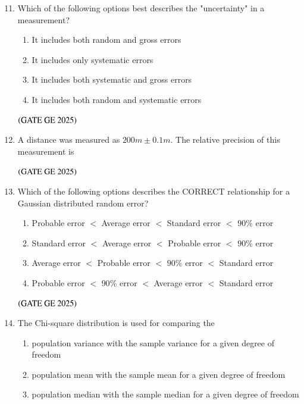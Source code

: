 \documentclass[journal,12pt,onecolumn]{IEEEtran}
\theoremstyle{remark}
\begin{document}
\begin{enumerate}
\setcounter{enumi}{10}
\item Which of the following options best describes the "uncertainty" in a measurement?
\begin{enumerate}
\item It includes both random and gross errors
\item It includes only systematic errors
\item It includes both systematic and gross errors
\item It includes both random and systematic errors
\end{enumerate}
\hfill $\left(\text{GATE GE 2025}\right)$
\bigskip

\item A distance was measured as $200 m \pm 0.1 m$.
The relative precision of this measurement is
\begin{enumerate}
\end{enumerate}
\hfill $\left(\text{GATE GE 2025}\right)$
\bigskip
\item Which of the following options describes the CORRECT relationship for a Gaussian distributed random error?
\begin{enumerate}
\item Probable error $<$ Average error $<$ Standard error $<$ $90$\% error
\item Standard error $<$ Average error $<$ Probable error $<$ $90$\% error
\item Average error $<$ Probable error $<$ $90$\% error $<$ Standard error
\item Probable error $<$ $90$\% error $<$ Average error $<$ Standard error
\end{enumerate}
\hfill $\left(\text{GATE GE 2025}\right)$
\bigskip
\item The Chi-square distribution is used for comparing the
\begin{enumerate}
\item population variance with the sample variance for a given degree of freedom
\item population mean with the sample mean for a given degree of freedom
\item population median with the sample median for a given degree of freedom

\end{enumerate}
\end{enumerate}
\end{document}

